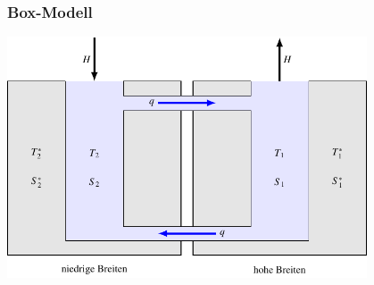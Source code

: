 %
%
%
\theoremstyle{definition}
\newtheorem{dgl}{Differentialgleichungen}
\newtheorem{dgl1}{Differentialgleichung}
\newtheorem{lsg}{Lösungen}
\newtheorem{anomalie}{Anomalie}
\newtheorem{zust}{Zustandsgleichung}
\newtheorem{zirk}{Zirkulationsrichtung}





%
%
\begin{frame}
\frametitle{Box-Modell}
\begin{center}
\includegraphics[width=0.8\textwidth]{../../skript/chapters/4/boxmodell.pdf}
\end{center}
\end{frame}

